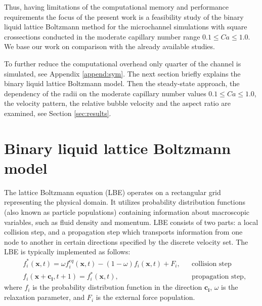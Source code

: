 \documentclass{article}
\begin{document}
Thus, having limitations of the computational memory and performance requirements the focus of the present work is a feasibility study of the binary liquid lattice Boltzmann method for the microchannel simulations with square crossections conducted in the moderate capillary number range $0.1 \leq Ca \leq 1.0$. We base our work on comparison with the already available studies. 

To further reduce the computational overhead only quarter of the channel is simulated, see Appendix
\ref{append:sym}. The next section briefly explains the binary liquid lattice Boltzmann model. Then
the steady-state approach, the dependency of the radii on the moderate capillary number values
$0.1\leq Ca \leq 1.0$, the velocity pattern, the relative bubble velocity and the aspect ratio are
examined, see Section \ref{sec:results}.

\section{Binary liquid lattice Boltzmann model}
The lattice Boltzmann equation (LBE) operates on a rectangular grid representing the
physical domain. It utilizes
probability distribution functions (also known as particle populations)
containing information about
macroscopic variables, such as fluid density and momentum. LBE consists of
two parts: a local collision step, and a propagation step which transports
information from one node to another in certain
directions specified by the discrete velocity set.
The LBE is typically implemented as follows:
\begin{equation}
\label{standard:implementation}
\begin{aligned}
&f_i^{*}(\bm{x},t)=\omega f_i^{eq}(\bm{x},t)-(1-\omega) f_i(\bm{x},t) +
F_i,&&\text{collision step}\\
&f_i(\bm{x}+\bm{c_i},t+1)=f_i^{*}(\bm{x},t),&&\text{propagation step}, 
\end{aligned}
\end{equation}
where $f_i$ is the probability distribution function in the direction $\bm{c_i}$, $\omega$ is the
relaxation parameter, and $F_i$ is the external force population. 
\end{document}
